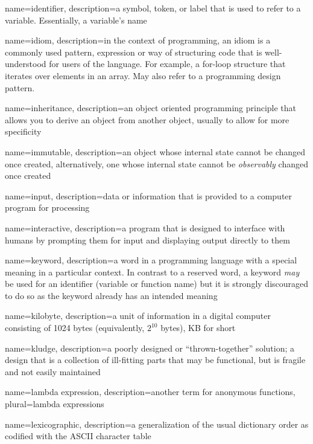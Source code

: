 {
  name=identifier,
  description={a symbol, token, or label that is used to refer to a variable.  Essentially, a variable's name}
}

{
  name=idiom,
  description={in the context of programming, an idiom is a commonly used pattern, expression or way of structuring code that is well-understood for users of the language.  For example, a for-loop structure that iterates over elements in an array.  May also refer to a programming design pattern.}
}

{
  name=inheritance,
  description={an object oriented programming principle that allows you to derive an object from another object, usually to allow for more specificity}
}

{
  name=immutable,
  description={an object whose internal state cannot be changed once created, alternatively, one whose internal state
  cannot be \emph{observably} changed once created}
}

{
  name=input,
  description={data or information that is provided to a computer program for processing}
}

{
  name=interactive,
  description={a program that is designed to interface with humans by prompting them for input and displaying output directly to them}
}

{
  name=keyword,
  description={a word in a programming language with a special meaning in a particular context.  In
	contrast to a reserved word, a keyword \emph{may} be used for an identifier (variable or function name)
	but it is strongly discouraged to do so as the keyword already has an intended meaning}
}

{
  name=kilobyte,
  description={a unit of information in a digital computer consisting of 1024 bytes (equivalently, $2^{10}$ bytes), KB for short}
}

{
  name=kludge,
  description={a poorly designed or ``thrown-together'' solution; a design that is a collection of ill-fitting parts that may be functional, but is fragile and not easily maintained}
}

{
  name=lambda expression,
  description={another term for anonymous functions},
  plural=lambda expressions
}

{
  name=lexicographic,
  description={a generalization of the usual dictionary order as codified with the ASCII character table}
}


